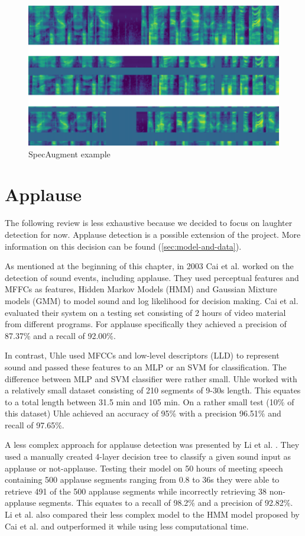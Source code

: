 \documentclass[bsc,frontabs,parskip,deptreport]{infthesis}
\begin{document}
\begin{figure}
    \centering
    \includegraphics[width=13cm]{imgs/examples/spec_augment_example.png}
    \caption{SpecAugment example}
    \label{fig:spec-augment}
\end{figure}

\section{Applause}
The following review is less exhaustive because we decided to focus on laughter detection for now. Applause detection is a possible extension of the project. 
More information on this decision can be found (\autoref{sec:model-and-data}).

As mentioned at the beginning of this chapter, in 2003 Cai et al. \citep{cai2003highlight} worked on the detection of sound events, including applause.
They used perceptual features and MFFCs as features, Hidden Markov Models (HMM) and Gaussian Mixture models (GMM) to model sound and log likelihood for decision making.
Cai et al. evaluated their system on a testing set consisting of 2 hours of video material from different programs.
For applause specifically they achieved a precision of 87.37\% and a recall of 92.00\%.

In contrast, Uhle \citep{uhle2011applause} used MFCCs and low-level descriptors (LLD) to represent sound and passed these features to an MLP or an SVM for classification.
The difference between MLP and SVM classifier were rather small.
Uhle worked with a relatively small dataset consisting of 210 segments of 9-30s length. This equates to a total length between 31.5 min and 105 min.
On a rather small test (10\% of this dataset) Uhle achieved an accuracy of 95\% with a precision 96.51\% and recall of 97.65\%.

A less complex approach for applause detection was presented by Li et al. \citep{li2009characteristics}.
They used a manually created 4-layer decision tree to classify a given sound input as applause or not-applause.
Testing their model on 50 hours of meeting speech containing 500 applause segments ranging from 0.8 to 36s they were able to retrieve 491 of the 500 applause segments while incorrectly retrieving 38 non-applause segments.
This equates to a recall of 98.2\% and a precision of 92.82\%. Li et al. also compared their less complex model to the HMM model proposed by Cai et al.\citep{cai2003highlight} and outperformed it while using less computational time.
\end{document}
